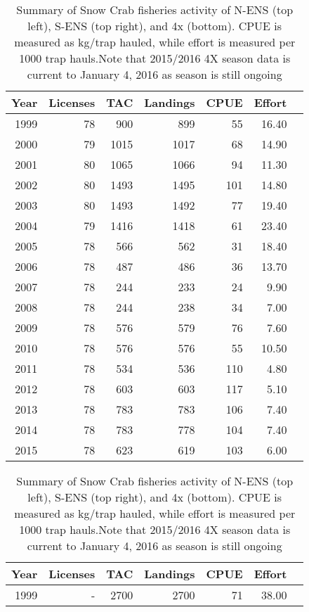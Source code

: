 \documentclass[paper=a4, fontsize=11pt]{article}
\begin{document}
\begin{table}[h]
\caption{ Summary of Snow Crab fisheries activity of N-ENS (top left), S-ENS (top right), and 4x (bottom). CPUE is measured as kg/trap hauled, while effort is measured per 1000 trap hauls.Note that 2015/2016 4X season data is current to January 4, 2016 as season is still ongoing}
\begin{tabular}{rrrrrrr}
  \hline
 Year & Licenses & TAC & Landings & CPUE & Effort \\ 
  \hline
1999 &  78 & 900 & 899 &  55 & 16.40 \\ 
2000 &  79 & 1015 & 1017 &  68 & 14.90 \\ 
2001 &  80 & 1065 & 1066 &  94 & 11.30 \\ 
2002 &  80 & 1493 & 1495 & 101 & 14.80 \\ 
2003 &  80 & 1493 & 1492 &  77 & 19.40 \\ 
2004 &  79 & 1416 & 1418 &  61 & 23.40 \\ 
2005 &  78 & 566 & 562 &  31 & 18.40 \\ 
2006 &  78 & 487 & 486 &  36 & 13.70 \\ 
2007 &  78 & 244 & 233 &  24 & 9.90 \\ 
2008 &  78 & 244 & 238 &  34 & 7.00 \\ 
2009 &  78 & 576 & 579 &  76 & 7.60 \\ 
2010 &  78 & 576 & 576 &  55 & 10.50 \\ 
2011 &  78 & 534 & 536 & 110 & 4.80 \\ 
2012 &  78 & 603 & 603 & 117 & 5.10 \\ 
2013 &  78 & 783 & 783 & 106 & 7.40 \\ 
2014 &  78 & 783 & 778 & 104 & 7.40 \\ 
2015 &  78 & 623 & 619 &  103 & 6.00 \\ 
   \hline
\end{tabular}
\qquad
\begin{tabular}{rrrrrrr}
  \hline
Year & Licenses & TAC & Landings & CPUE & Effort \\ 
  \hline
1999 & - & 2700 & 2700 &  71 & 38.00 \\ 

\end{tabular}
\end{table}
\end{document}
